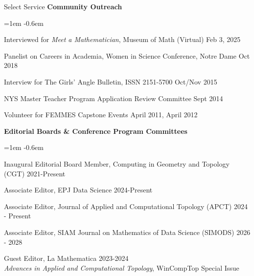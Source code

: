 \documentclass{resume} %
\begin{document}
\begin{rSection}{Select Service}
\textbf{Community Outreach}
\begin{list}{}{\leftmargin=1em}
   \itemsep -0.6em \vspace{-0.5em} %
\item Interviewed for \textit{Meet a Mathematician}, Museum of Math (Virtual) \hfill Feb 3, 2025
\item
Panelist on Careers in Academia, Women in Science Conference, Notre Dame \hfill Oct 2018
\item Interview for The Girls' Angle Bulletin,  ISSN 2151-5700 \hfill Oct/Nov 2015
\item
{NYS Master Teacher Program Application Review Committee} \hfill Sept 2014
\item
{Volunteer for FEMMES  Capstone Events} \hfill April 2011, April 2012
\end{list}

\textbf{Editorial Boards \& Conference Program Committees}

\begin{list}{}{\leftmargin=1em}
   \itemsep -0.6em \vspace{-0.5em} %
   \item Inaugural Editorial Board Member, Computing in Geometry and Topology (CGT)  \hfill 2021-Present
   \item Associate Editor, EPJ Data Science \hfill 2024-Present
   \item Associate Editor, Journal of Applied and Computational Topology (APCT) \hfill 2024 - Present
   \item Associate Editor, SIAM Journal on Mathematics of Data Science (SIMODS) \hfill 2026 - 2028
   \item Guest Editor, La Mathematica \hfill 2023-2024\\ 
   \phantom{MMM}\textit{Advances in Applied and Computational Topology}, WinCompTop Special Issue 
\end{list}




\end{rSection}
\end{document}
